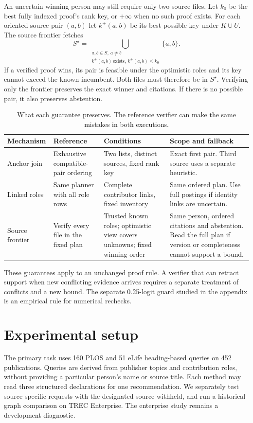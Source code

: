 \documentclass[sigconf,natbib=true,anonymous=true,pbalance=true]{acmart}
\begin{document}
An uncertain winning person may still require only two source files. Let $k_0$ be the best fully indexed proof's rank key, or $+\infty$ when no such proof exists. For each oriented source pair $(a,b)$ let $k^{+}(a,b)$ be its best possible key under $K\cup U$. The source frontier fetches
\[
S^{\star}=\bigcup_{\substack{a,b\in S,\ a\ne b\\
 k^{+}(a,b)\,\mathrm{exists},\ k^{+}(a,b)\le k_0}}\{a,b\}.
\]
If a verified proof wins, its pair is feasible under the optimistic roles and its key cannot exceed the known incumbent. Both files must therefore be in $S^{\star}$. Verifying only the frontier preserves the exact winner and citations. If there is no possible pair, it also preserves abstention.

\begin{table}[t]
\centering\small
\caption{What each guarantee preserves. The reference verifier can make the same mistakes in both executions.}
\label{tab:guarantees}
\begin{tabular}{@{}p{}p{}p{}p{}@{}}
\toprule
Mechanism & Reference & Conditions & Scope and fallback \\\midrule
Anchor join & Exhaustive compatible-pair ordering & Two lists, distinct sources, fixed rank key & Exact first pair. Third source uses a separate heuristic. \\
Linked roles & Same planner with all role rows & Complete contributor links, fixed inventory & Same ordered plan. Use full postings if identity links are uncertain. \\
Source frontier & Verify every file in the fixed plan & Trusted known roles; optimistic view covers unknowns; fixed winning order & Same person, ordered citations and abstention. Read the full plan if version or completeness cannot support a bound. \\
\bottomrule
\end{tabular}
\end{table}

These guarantees apply to an unchanged proof rule. A verifier that can retract support when new conflicting evidence arrives requires a separate treatment of conflicts and a new bound. The separate 0.25-logit guard studied in the appendix is an empirical rule for numerical rechecks.

\section{Experimental setup}
\label{sec:data}
The primary task uses 160 PLOS and 51 eLife heading-based queries on 452 publications. Queries are derived from publisher topics and contribution roles, without providing a particular person's name or source title. Each method may read three structured declarations for one recommendation. We separately test source-specific requests with the designated source withheld, and run a historical-graph comparison on TREC Enterprise. The enterprise study remains a development diagnostic.
\end{document}
